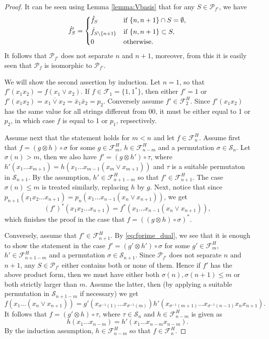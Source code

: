 \documentclass[12pt]{article}
\theoremstyle{definition}
\theoremstyle{remark}
\def\perm{\mathcal S}
\def\Pe{\mathcal P}
\def\Fe{\mathcal F}
\begin{document}
\begin{proof}
It can be seen using Lemma \ref{lemma:Vbasis} that for any $S\in \Pe_{f'}$, we have
\[
\hat f'_S =\begin{dcases} \hat f_S & \text{if } \{n,n+1\}\cap S=\emptyset,\\
\hat f_{S\setminus \{n+1\}} & \text{if } \{n,n+1\}\subset S,\\
0 & \text{otherwise}.
\end{dcases}       
\]
It follows that $\Pe_{f'}$ does not separate $n$ and $n+1$, moreover, from this it is
easily seen that   $\Pe_f$ is
isomorphic to $\Pe_{f'}$. 

We will show the second assertion by induction. 
Let $n=1$, so that $f'(x_1x_2)=f(x_1\vee x_2)$. If $f\in \Fe_1=\{1,1^*\}$, then either
$f'=1$ or $f'(x_1x_2)=\overline{x_1\vee x_2}=\bar x_1\bar x_2=p_2$. Conversely assume $f'\in
\Fe_2^H$. Since $f'(x_1x_2)$ has the same value for all strings different from 00, it must
be either equal to 1 or $p_2$, in which case $f$ is equal to 1 or $p_1$, repsectively. 

Assume next that the statement holds for $m<n$ and let $f\in \Fe_n^H$. Assume first that $f=(g\otimes
h)\circ \sigma$ for some $g\in \Fe_m^H$,
$h\in \Fe_{n-m}^H$ and a permutation $\sigma\in \perm_n$.  Let $\sigma(n)> m$,  
then we also have  $f'=(g\otimes h')\circ \tau$, where $h'(x_1\dots x_{m+1}) =h(x_1\dots x_{m-1}(x_m\vee x_{m+1}))$
and $\tau$ is a suitable permutaton in $\perm_{n+1}$. 
By the assumption, $h'\in \Fe_{n+1-m}^H$ so that $f'\in
\Fe_{n+1}^H$. The case $\sigma(n)\le m$ is treated similarly, replacing $h$ by $g$. 
Next, notice that since $p_{n+1}(x_1x_2\dots x_{n+1})=p_n(x_1\dots x_{n-1}(x_n\vee x_{n+1}))$,  we get
\begin{equation}\label{eq:fprime_dual}
(f')^*(x_1x_2\dots x_{n+1})=f^*(x_1\dots x_{n-1}(x_n\vee x_{n+1})),
\end{equation}
which finishes the proof in the case that $f=((g\otimes h)\circ\sigma)^*$. 


Conversely, assume that $f'\in \Fe_{n+1}^H$. By \eqref{eq:fprime_dual}, we see that it is
enough to show the statement in the case $f'=(g'\otimes h')\circ \sigma$ for some $g'\in
\Fe_m^H$, $h'\in
\Fe_{n+1-m}^H$ and a permutation $\sigma\in \perm_{n+1}$. Since
$\Pe_{f'}$ does not separate $n$ and $n+1$, any $S\in \Pe_{f'}$
either contains both  or none of them. Hence if $f'$ has the above product form,
then we must have either  both $\sigma(n),\sigma(n+1)\le m$ or both strictly
larger than $m$. Assume the latter, then (by applying a suitable permutation in
$\perm_{n+1-m}$ if
necessary) we get
\[
f(x_1\dots (x_n\vee x_{n+1}))=g'(x_{\sigma^{-1}(1)}\dots
x_{\sigma^{-1}(m)})h'(x_{\sigma^{-1}(m+1)}\dots x_{\sigma^{-1}(n-1)}x_nx_{n+1}).
\]
It follows that $f=(g'\otimes h)\circ \tau$, where $\tau\in \perm_n$ and $h\in \Fe_{n-m}^H$ is
given as
\[
h(x_1\dots x_{n-m})=h'(x_1\dots x_{n-m}x_{n-m}).
\]
By the induction assumption, $h\in \Fe_{n-m}^H$ so that $f\in \Fe_n^H$.


\end{proof}
\end{document}
